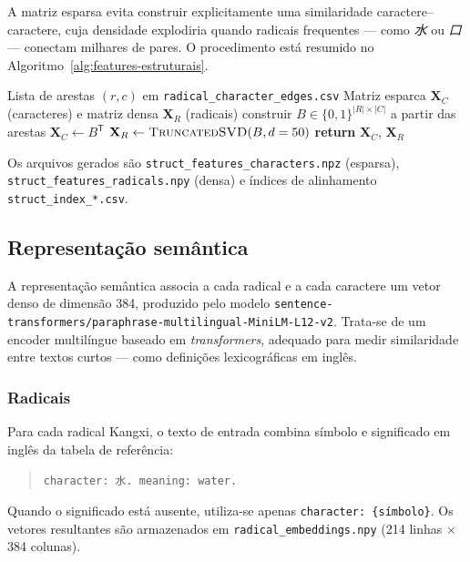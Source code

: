 \documentclass[10pt, a4paper, titlepage]{extarticle}
\begin{document}
A matriz esparsa evita construir explicitamente uma similaridade caractere--caractere, cuja densidade explodiria quando radicais frequentes --- como \textit{水} ou \textit{口} --- conectam milhares de pares. O procedimento está resumido no Algoritmo~\ref{alg:features-estruturais}.

\begin{algorithm}[H]
\caption{Construção das features estruturais}
\label{alg:features-estruturais}
\begin{algorithmic}[1]
\Require Lista de arestas $(r,c)$ em \texttt{radical\_character\_edges.csv}
\Ensure Matriz esparca $\mathbf{X}_C$ (caracteres) e matriz densa $\mathbf{X}_R$ (radicais)
\State construir $B \in \{0,1\}^{|R|\times|C|}$ a partir das arestas
\State $\mathbf{X}_C \gets B^{\mathsf{T}}$ 
\State $\mathbf{X}_R \gets \textsc{TruncatedSVD}(B, d=50)$ 
\State \textbf{return} $\mathbf{X}_C$, $\mathbf{X}_R$
\end{algorithmic}
\end{algorithm}

Os arquivos gerados são \texttt{struct\_features\_characters.npz} (esparsa), \texttt{struct\_features\_radicals.npy} (densa) e índices de alinhamento \texttt{struct\_index\_*.csv}.

\subsection{Representação semântica}
A representação semântica associa a cada radical e a cada caractere um vetor denso de dimensão 384, produzido pelo modelo \texttt{sentence-transformers/paraphrase-multilingual-MiniLM-L12-v2}. Trata-se de um encoder multilíngue baseado em \textit{transformers}, adequado para medir similaridade entre textos curtos --- como definições lexicográficas em inglês.

\subsubsection{Radicais}
Para cada radical Kangxi, o texto de entrada combina símbolo e significado em inglês da tabela de referência:
\begin{quote}
\texttt{character: 水. meaning: water.}
\end{quote}
Quando o significado está ausente, utiliza-se apenas \texttt{character: \{símbolo\}}. Os vetores resultantes são armazenados em \texttt{radical\_embeddings.npy} (214 linhas $\times$ 384 colunas).
\end{document}
